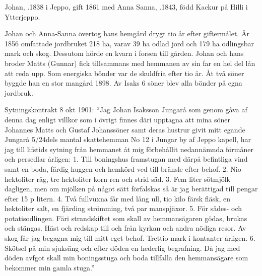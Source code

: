 Johan, .1838 i Jeppo, gift 1861 med Anna Sanna, .1843, född Kackur på Hilli i Ytterjeppo.
\begin{jhchildren}
  \item {}
  \item {}
  \item {}
  \item {}
  \item {}
  \item {}
  \item {}
  \item {}
  \item {}
  \item {}
  \item {}
\end{jhchildren}
Johan och Anna-Sanna övertog hans hemgård drygt tio år efter giftermålet. År 1856 omfattade jordbruket 218 ha, varav 39 ha odlad jord och 179 ha odlingsbar mark och skog. Dessutom hörde en kvarn i forsen till gården. Johan och hans broder Matts (Gunnar) fick tillsammans med hemmanen av sin far en hel del lån att reda upp. Som energiska bönder var de skuldfria efter tio år. Åt två söner byggde han en stor mangård 1898. Av Isaks 6 söner blev alla 	bönder på egna jordbruk.

Sytningskontrakt 8 okt 1901: ``Jag Johan Isaksson Jungarå som genom gåva af denna dag enligt villkor som i övrigt finnes däri 	upptagna att mina söner Johannes Matts och Gustaf Johanssöner samt deras hustrur givit mitt egande Jungarå 5/24dels mantal skattehemman No 12 i Jungar by af Jeppo kapell, har jag till lifstids sytning från hemmanet åt mig förbehållit nedannämnda förmåner och persedlar årligen: 1. Till boningshus framstugan med därpå befintliga vind samt en boda, färdig huggen och hemkörd ved till bränsle efter behof. 2. Nio hektoliter råg, tre hektoliter korn ren och strid säd. 3. Fem liter sötmjölk dagligen, men om mjölken på något sätt förfalskas så är jag berättigad till pengar efter 15 p litern. 4. Två fullvuxna får med lång ull, tio kilo färsk fläsk, en hektoliter salt, en fjärding strömming, två par manspjäxor. 5. För sädes- och potatisodlingen. Färi strandskiftet som skall av hemmansägaren gödas, brukas och stängas. Häst och redskap till och från kyrkan och andra nödiga resor. Av skog får jag begagna mig till mitt eget behof. Trettio mark i kontanter årligen. 6. Skötsel på min sjuksäng och efter döden en hederlig begrafning. Då jag med döden avfgot skall min boningsstuga och boda tillfalla den hemmansägare som bekommer min gamla stuga.''



